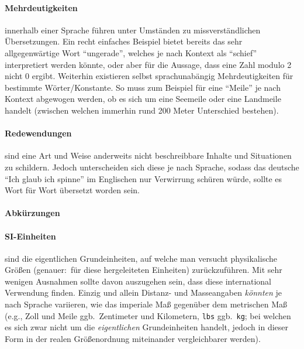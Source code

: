 \paragraph*{Mehrdeutigkeiten} innerhalb einer Sprache führen unter Umständen zu missverständlichen Übersetzungen. Ein recht einfaches Beispiel bietet bereits das sehr allgegenwärtige Wort \enquote{ungerade}, welches je nach Kontext als \enquote{schief} interpretiert werden könnte, oder aber für die Aussage, dass eine Zahl modulo 2 nicht 0 ergibt. Weiterhin existieren selbst sprachunabängig Mehrdeutigkeiten für bestimmte Wörter/Konstante. So muss zum Beispiel für eine \enquote{Meile} je nach Kontext abgewogen werden, ob es sich um eine Seemeile oder eine Landmeile handelt (zwischen welchen immerhin rund 200 Meter Unterschied bestehen).  %

\paragraph*{Redewendungen} sind eine Art und Weise anderweits nicht beschreibbare Inhalte und Situationen zu schildern. Jedoch unterscheiden sich diese je nach Sprache, sodass das deutsche \enquote{Ich glaub ich spinne} im Englischen nur Verwirrung schüren würde, sollte es Wort für Wort übersetzt worden sein.

\paragraph*{Abkürzungen}

\paragraph*{SI-Einheiten\label{par:siunits}} sind die eigentlichen Grundeinheiten, auf welche man versucht physikalische Größen (genauer:\ für diese hergeleiteten Einheiten) zurückzuführen. Mit sehr wenigen Ausnahmen sollte davon auszugehen sein, dass diese international Verwendung finden. Einzig und allein %
Distanz- und Masseangaben \textit{könnten} je nach Sprache variieren, wie das imperiale Maß gegenüber dem metrischen Maß (e.g., Zoll und Meile ggb.\ Zentimeter und Kilometern, \texttt{lbs} ggb.\ \texttt{kg}; bei welchen es sich zwar nicht um die \textit{eigentlichen} Grundeinheiten handelt, jedoch in dieser Form in der realen Größenordnung miteinander vergleichbarer werden).%

